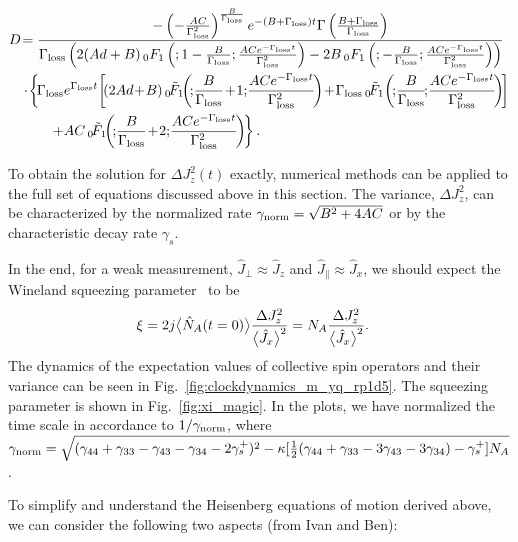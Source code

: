 \begin{align}
D &\!= \frac{- \left(-\frac{AC }{\Gamma_{\rm loss}^2 }\right)^{\frac{ B}{\Gamma_{\rm loss} }} e^{-(B+\Gamma_{\rm loss})t} \Gamma \left(\frac{B+\Gamma_{\rm loss} }{\Gamma_{\rm loss} }\right) }
{\Gamma_{\rm loss}  \left(2 (A d+B) \, _0F_1\left(;1-\frac{B}{\Gamma_{\rm loss} };\frac{A C e^{-\Gamma_{\rm loss} t}}{\Gamma_{\rm loss} ^2}\right)-2 B \, _0F_1\left(;-\frac{B}{\Gamma_{\rm loss} };\frac{A C e^{-\Gamma_{\rm loss}t }}{\Gamma_{\rm loss} ^2}\right)\right)}\nonumber\\
&\cdot\! \left\{\!\Gamma_{\rm loss}  e^{\Gamma_{\rm loss}  t}\! \left[\!(2 A d \!+\! B) \, _0\!\tilde{F}_1\!\!\left(\!;\!\frac{B}{\Gamma_{\rm loss} }\!+\!1;\!\frac{A C e^{-\Gamma_{\rm loss} t}}{\Gamma_{\rm loss} ^2}\!\right)\!+\!\Gamma_{\rm loss}  \, _0\!\tilde{F}_1\!\left(\!;\!\frac{B}{\Gamma_{\rm loss} }\!;\!\frac{A C e^{-\Gamma_{\rm loss} t}}{\Gamma_{\rm loss} ^2}\!\right)\!\right]\right. \nonumber\\
&\quad \quad \left. +A C \, _0\!\tilde{F}_1\!\!\left(\!;\!\frac{B}{\Gamma_{\rm loss} }\!+\! 2;\!\frac{A C e^{-\Gamma_{\rm loss} t }}{\Gamma_{\rm loss} ^2}\!\right)\!\right\}.
\end{align}

To obtain the solution for $ \Delta J_z^2(t) $ exactly, numerical methods can be applied to the full set of equations discussed above in this section. 
The variance, $\Delta J_z^2 $, can be characterized by the normalized rate $ \gamma_{\rm norm}= \sqrt{B^2 + 4 AC}$ or by the characteristic decay rate $ \gamma_s $. 

In the end, for a weak measurement, $ \hat{J}_\perp\approx \hat{J}_z $ and $ \hat{J}_\parallel\approx\hat{J}_x $, we should expect the Wineland squeezing parameter~\cite{Wineland1992} to be
\begin{align}
\xi &= 2j\big\langle \hat{N}_A(t=0) \big\rangle\frac{\Delta J_z^2}{\big\langle \hat{J}_x \big\rangle^2}
=N_A\frac{\Delta J_z^2}{\big\langle \hat{J}_x \big\rangle^2}.
\end{align}
The dynamics of the expectation values of collective spin operators and their variance can be seen in Fig.~\ref{fig:clockdynamics_m_yq_rp1d5}. The squeezing parameter is shown in Fig.~\ref{fig:xi_magic}. 
In the plots, we have normalized the time scale in accordance to $ 1/\gamma_{\rm norm} $, where $ \gamma_{\rm norm} = \sqrt{ (\gamma_{44} +\gamma_{33} -\gamma_{43} -\gamma_{34} -2\gamma_s^+ )^2 -\kappa [\frac{1}{2}(\gamma_{44} +\gamma_{33} -3\gamma_{43} -3\gamma_{34}) -\gamma_s^+ ] N_A } $.


To simplify and understand the Heisenberg equations of motion derived above, we can consider the following two aspects (from Ivan and Ben):


